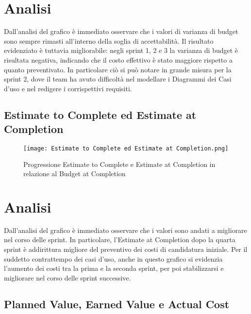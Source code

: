 \section*{Analisi}

Dall’analisi del grafico è immediato osservare che i valori di varianza di budget sono
sempre rimasti all’interno della soglia di accettabilità. Il risultato evidenziato è 
tuttavia migliorabile: negli sprint 1, 2 e 3 la varianza di budget è risultata negativa,
indicando che il costo effettivo è stato maggiore rispetto a quanto preventivato. In
particolare ciò si può notare in grande misura per la sprint 2, dove il team ha avuto difficoltà nel
modellare i Diagrammi dei Casi d'uso e nel redigere i corrispettivi requisiti.

\newpage

\subsection{Estimate to Complete ed Estimate at Completion}
\label{subsec:Estimate to Complete ed Estimate at Completion}

\begin{figure}[h] 
    \centering
    \texttt{[image: Estimate to Complete ed Estimate at Completion.png]}
    \caption{Progressione Estimate to Complete e Estimate at Completion in relazione al Budget at Completion} 
    \label{fig: Estimate to Complete ed Estimate at Completion}
\end{figure}

\section*{Analisi}

Dall’analisi del grafico è immediato osservare che i valori sono andati a migliorare
nel corso delle sprint. In particolare, l’Estimate at Completion dopo la quarta sprint
è addirittura migliore del preventivo dei costi di candidatura iniziale. Per il suddetto
contrattempo dei casi d'uso, anche in questo grafico si evidenzia l'aumento dei costi tra la prima
e la seconda sprint, per poi stabilizzarsi e migliorare nel corso delle sprint successive.

\newpage

\subsection{Planned Value, Earned Value e Actual Cost}
\label{subsec:Planned Value, Earned Value e Actual Cost}

